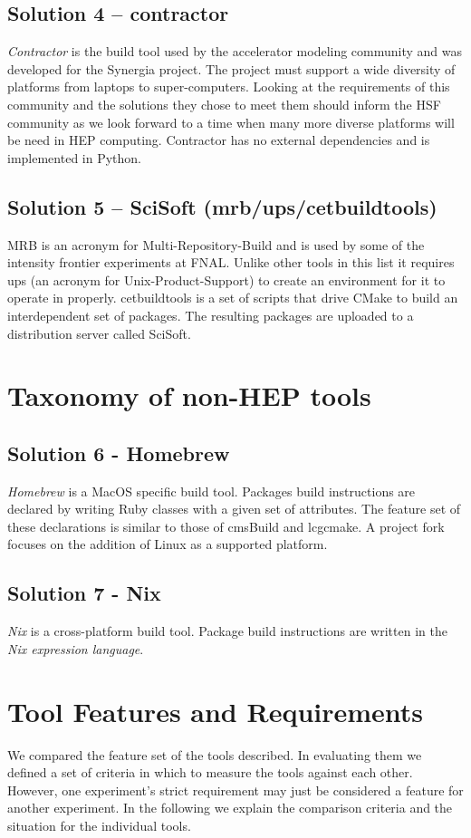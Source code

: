 \documentclass[12pt,a4paper]{article}
\begin{document}
\subsection{Solution 4 -- contractor} 
\emph{Contractor} is the build tool used by the accelerator modeling community and was developed for the Synergia project.  The project must support a wide diversity of platforms from laptops to super-computers.  Looking at the requirements of this community and the solutions they chose to meet them should inform the HSF community as we look forward to a time when many more diverse platforms will be need in HEP computing.  Contractor has no external dependencies and is implemented in Python.

\subsection{Solution 5 -- SciSoft (mrb/ups/cetbuildtools)}
MRB is an acronym for Multi-Repository-Build and is used by some of the intensity frontier experiments at FNAL. Unlike other tools in this list it requires ups (an acronym for Unix-Product-Support) to create an environment for it to operate in properly.  cetbuildtools is a set of scripts that drive CMake to build an interdependent set of packages.  The resulting packages are uploaded to a distribution server called SciSoft.


\section{Taxonomy of non-HEP tools}
\subsection{Solution 6 - Homebrew }
\emph{Homebrew}\cite{homebrew} is a MacOS specific build tool. Packages build instructions are declared by writing Ruby classes with a given set of attributes. The feature set of these declarations is similar to those of cmsBuild and lcgcmake. A project fork focuses on the addition of Linux as a supported platform.

\subsection{Solution 7 - Nix }
\emph{Nix}\cite{nix} is a cross-platform build tool. Package build instructions are written in the \emph{Nix expression language}.

\section{Tool Features and Requirements}
We compared the feature set of the tools described. In evaluating them we defined a set of criteria in which to measure the tools against each other. However, one experiment's strict requirement may just be considered a feature for another experiment. In the following we explain the comparison criteria and the situation for the individual tools.
\end{document}
